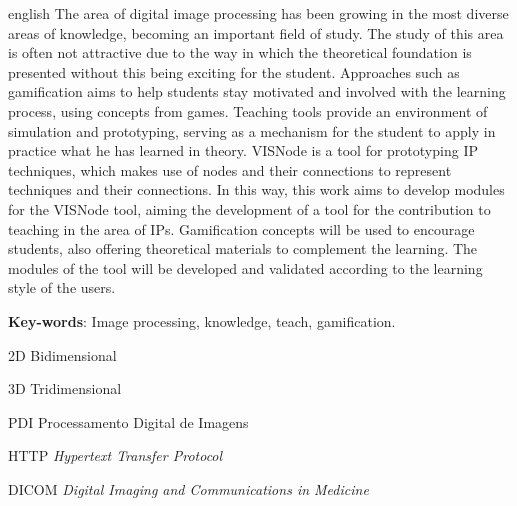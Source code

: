\documentclass[
	12pt,				%
	oneside,			%
	a4paper,			%
	english,			%
	french,				%
	spanish,			%
	brazil,				%
	]{abntex2}
\begin{document}
\begin{resumo}[ABSTRACT]
 \begin{otherlanguage*}{english}
The area of digital image processing has been growing in the most diverse areas of knowledge, becoming an important field of study. The study of this area is often not attractive due to the way in which the theoretical foundation is presented without this being exciting for the student. Approaches such as gamification aims to help students stay motivated and involved with the learning process, using concepts from games. Teaching tools provide an environment of simulation and prototyping, serving as a mechanism for the student to apply in practice what he has learned in theory. VISNode is a tool for prototyping IP techniques, which makes use of nodes and their connections to represent techniques and their connections. In this way, this work aims to develop modules for the VISNode tool, aiming the development of a tool for the contribution to teaching in the area of IPs. Gamification concepts will be used to encourage students, also offering theoretical materials to complement the learning. The modules of the tool will be developed and validated according to the learning style of the users.

   \vspace{\onelineskip}
 
   \noindent 
   \textbf{Key-words}: Image processing, knowledge, teach, gamification.
 \end{otherlanguage*}
\end{resumo}


\listoffigures*
\cleardoublepage

\listoftables*
\cleardoublepage

\begin{siglas}
  \item[2D] Bidimensional
  \item[3D] Tridimensional
  \item[PDI] Processamento Digital de Imagens
  \item[HTTP] \textit{Hypertext Transfer Protocol}
  \item[DICOM] \textit{Digital Imaging and Communications in Medicine}
\end{siglas}
\end{document}

